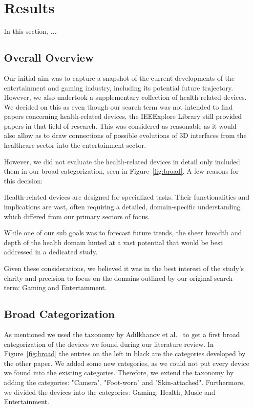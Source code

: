 \section{Results}
\label{sec:results}

In this section, ...


\subsection{Overall Overview}
\label{qual_res}

Our initial aim was to capture a snapshot of the current developments of the entertainment and gaming industry, including its potential future trajectory. However, we also undertook a supplementary collection of health-related devices. We decided on this as even though our search term was not intended to find papers concerning health-related devices, the IEEExplore Library still provided papers in that field of research. This was considered as reasonable as it would also allow as to draw connections of possible evolutions of 3D interfaces from the healthcare sector into the entertainment sector.

However, we did not evaluate the health-related devices in detail only included them in our broad categorization, seen in Figure~\ref{fig:broad}. A few reasons for this decision:

Health-related devices are designed for specialized tasks. Their functionalities and implications are vast, often requiring a detailed, domain-specific understanding which differed from our primary sectors of focus.

While one of our sub goals was to forecast future trends, the sheer breadth and depth of the health domain hinted at a vast potential that would be best addressed in a dedicated study.

Given these considerations, we believed it was in the best interest of the study's clarity and precision to focus on the domains outlined by our original search term: Gaming and Entertainment. 


\subsection{Broad Categorization}
\label{ss: broad}
As mentioned we used the taxonomy by Adilkhanov et al.~\cite{Adilkhanov22} to get a first broad categorization of the devices we found during our literature review. In Figure~\ref{fig:broad} the entries on the left in black are the categories developed by the other paper. We added some new categories, as we could not put every device we found into the existing categories. Therefore, we extend the taxonomy by adding the categories: "Camera", "Foot-worn" and "Skin-attached". Furthermore, we divided the devices into the categories: Gaming, Health, Music and Entertainment. 

